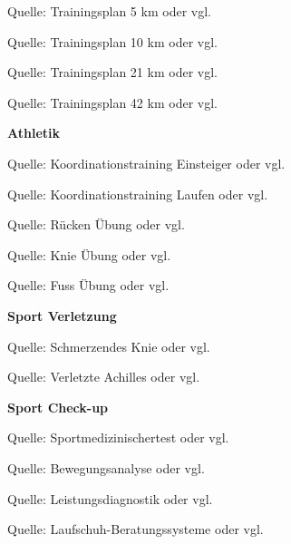 Quelle: Trainingsplan 5 km oder
vgl.~\cite{trainingsplan_5km:2018}

Quelle: Trainingsplan 10 km oder
vgl.~\cite{trainingsplan_10km:2018}

Quelle: Trainingsplan 21 km oder
vgl.~\cite{trainingsplan_21km:2018}

Quelle: Trainingsplan 42 km oder
vgl.~\cite{trainingsplan_42km:2018}

\textbf{Athletik}

Quelle: Koordinationstraining
Einsteiger oder
vgl.~\cite{koordinationstraining_einsteiger:2018}

Quelle: Koordinationstraining
Laufen oder
vgl.~\cite{koordinationstraining_laufen:2018}

Quelle: Rücken Übung oder
vgl.~\cite{ruecken_uebung:2018}

Quelle: Knie Übung oder
vgl.~\cite{knie_uebung:2018}

Quelle: Fuss Übung oder
vgl.~\cite{fuss_uebung:2018}

\textbf{Sport Verletzung}

Quelle: Schmerzendes Knie oder
vgl.~\cite{schmerzendes_knie:2018}

Quelle: Verletzte Achilles oder
vgl.~\cite{verletzte_achilles:2018}

\textbf{Sport Check-up}

Quelle:
Sportmedizinischertest oder
vgl.~\cite{sportmedizinischer_test:2018}

Quelle: Bewegungsanalyse oder
vgl.~\cite{bewegungsanalyse:2018}

Quelle: Leistungsdiagnostik oder
vgl.~\cite{leistungsdiagnostik:2018}

Quelle:
Laufschuh-Beratungssysteme
oder vgl.~\cite{laufschuh-beratungssysteme:2018}
